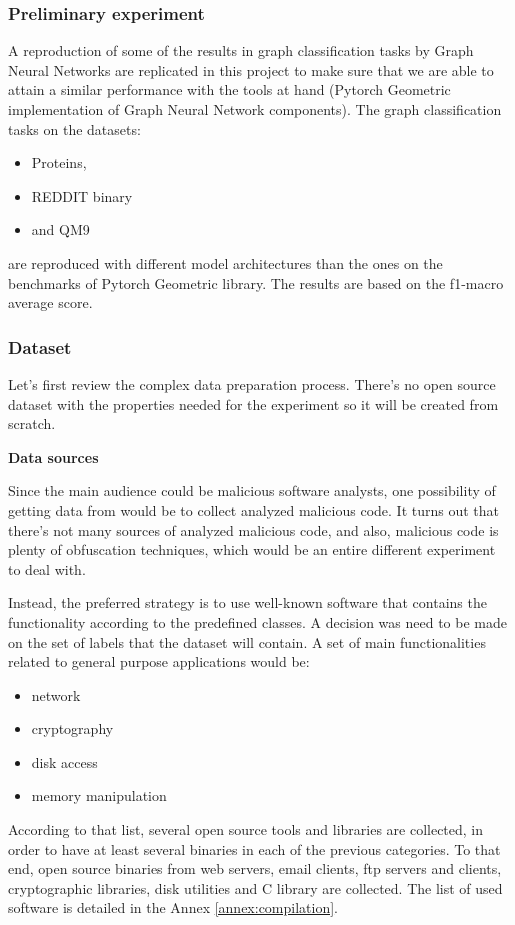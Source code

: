 \subsubsection{Preliminary experiment}

A reproduction of some of the results in graph classification tasks by Graph Neural Networks are replicated in this project to make sure that we are able to attain a similar performance with the tools at hand (Pytorch Geometric implementation of Graph Neural Network components). The graph classification tasks on the datasets:
\begin{itemize} 	
	\item Proteins, 
	\item REDDIT binary
	\item and QM9 
\end{itemize} 

are reproduced with different model architectures than the ones on the benchmarks of Pytorch Geometric library. The results are based on the f1-macro average score.




\subsubsection{Dataset}

Let's first review the complex data preparation process. There's no open source dataset with the properties needed for the experiment so it will be created from scratch.



\textbf{Data sources}

Since the main audience could be malicious software analysts, one possibility of getting data from would be to collect analyzed malicious code. It turns out that there's not many sources of analyzed malicious code, and also, malicious code is plenty of obfuscation techniques, which would be an entire different experiment to deal with. 

Instead, the preferred strategy is to use well-known software that contains the functionality according to the predefined classes. A decision was need to be made on the set of labels that the dataset will contain. A set of main functionalities related to general purpose applications would be:
\begin{itemize}
	\item network
	\item cryptography
	\item disk access
	\item memory manipulation
\end{itemize}
According to that list, several open source tools and libraries are collected, in order to have at least several binaries in each of the previous categories. To that end, open source binaries from web servers, email clients, ftp servers and clients, cryptographic libraries, disk utilities and C library are collected. The list of used software is detailed in the Annex \ref{annex:compilation}.

